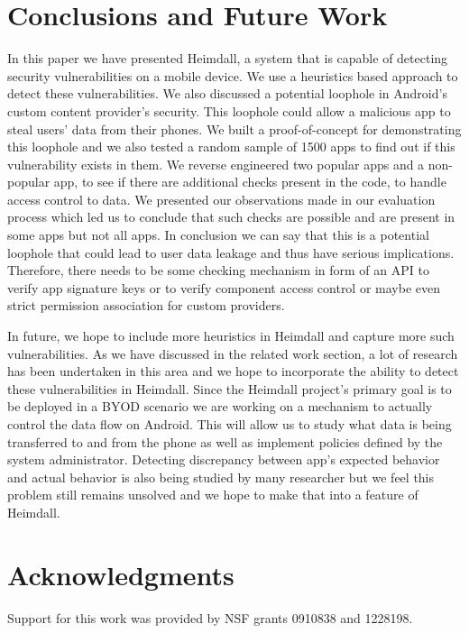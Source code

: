\section{Conclusions and Future Work}
\label{concl}
In this paper we have presented Heimdall, a system that is capable of detecting security vulnerabilities on a mobile device. We use a heuristics based approach to detect these vulnerabilities. We also discussed a potential loophole in Android's custom content provider's security. This loophole could allow a malicious app to steal users' data from their phones. We built a proof-of-concept for demonstrating this loophole and we also tested a random sample of 1500 apps to find out if this vulnerability exists in them. We reverse engineered two popular apps and a non-popular app, to see if there are additional checks present in the code, to handle access control to data. We presented our observations made in our evaluation process which led us to conclude that such checks are possible and are present in some apps but not all apps. In conclusion we can say that this is a potential loophole that could lead to user data leakage and thus have serious implications. Therefore, there needs to be some checking mechanism in form of an API to verify app signature keys or to verify component access control or maybe even strict permission association for custom providers.

In future, we hope to include more heuristics in Heimdall and capture more such vulnerabilities. As we have discussed in the related work section, a lot of research has been undertaken in this area and we hope to incorporate the ability to detect these vulnerabilities in Heimdall. Since the Heimdall project's primary goal is to be deployed in a BYOD scenario we are working on a mechanism to actually control the data flow on Android. This will allow us to study what data is being transferred to and from the phone as well as implement policies defined by the system administrator. Detecting discrepancy between app's expected behavior and actual behavior is also being studied by many researcher but we feel this problem still remains unsolved and we hope to make that into a feature of Heimdall. 

\section{Acknowledgments}
Support for this work was provided by NSF grants 0910838 and 1228198.


%
%

